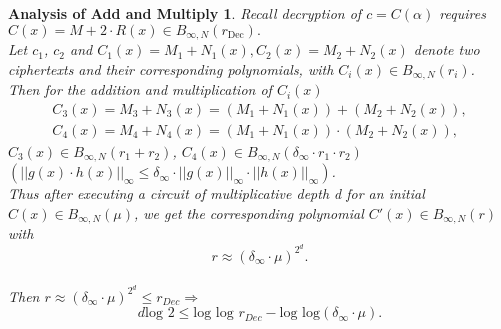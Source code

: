 \documentclass{beamer}
\newtheorem{aoam}{Analysis of Add and Multiply}
\begin{document}
\begin{frame}
\begin{footnotesize}

\begin{aoam}

Recall decryption of $c = C(\alpha)$ requires $C(x) = M + 2\cdot R(x)\in B_{\infty, N}(r_{\text{Dec}}).$
\pause
\\Let  $c_1$, $c_2$ and $C_1(x) = M_1+N_1(x), C_2(x) = M_2+N_2(x)$ denote two ciphertexts and their corresponding polynomials, with $C_i(x)\in B_{\infty, N}(r_i)$. 
\pause
\\Then for the addition and multiplication of $C_i(x)$
\begin{gather*}
C_3(x) = M_3+N_3(x) = (M_1+N_1(x)) + (M_2+N_2(x)),
\\C_4(x) = M_4+N_4(x) = (M_1+N_1(x)) \cdot (M_2+N_2(x)),
\end{gather*}
$C_3(x)\in B_{\infty, N}(r_1+r_2)$, $C_4(x)\in B_{\infty, N}(\delta_{\infty}\cdot r_1\cdot r_2)$ \hspace{2mm}$(||g(x)\cdot h(x)||_{\infty} \leq \delta_{\infty}\cdot||g(x)||_{\infty}\cdot||h(x)||_{\infty})$.
\pause
\\Thus after executing a circuit of multiplicative depth d for an initial $C(x)\in B_{\infty, N}(\mu)$, we get the corresponding polynomial $C'(x)\in B_{\infty, N}(r)$ with $$r \approx (\delta_{\infty}\cdot \mu)^{2^{d}}.$$
\\Then $r \approx (\delta_{\infty}\cdot \mu)^{2^{d}} \leq r_{Dec} \Rightarrow$
$$d\text{log }2 \leq \text{log log } r_{Dec} - \text{log log}(\delta_{\infty}\cdot \mu).$$
\end{aoam}
\end{footnotesize}
\end{frame}


\end{document}
